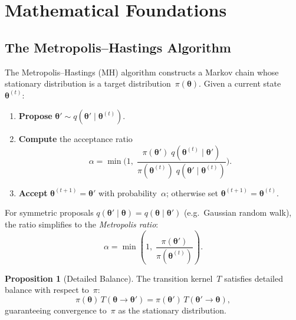 \documentclass[11pt,letterpaper,twocolumn]{article}
\theoremstyle{definition}
\newtheorem{proposition}{Proposition}
\begin{document}
\section{Mathematical Foundations}\label{sec:math}

\subsection{The Metropolis--Hastings Algorithm}

The Metropolis--Hastings (MH) algorithm constructs a Markov chain whose stationary distribution is a target distribution~$\pi(\bm{\theta})$.  Given a current state~$\bm{\theta}^{(t)}$:

\begin{enumerate}
  \item \textbf{Propose} $\bm{\theta}' \sim q(\bm{\theta}' \mid \bm{\theta}^{(t)})$.
  \item \textbf{Compute} the acceptance ratio
  \begin{equation}\label{eq:mh-ratio}
    \alpha = \min\!\Bigg(1,\;
      \frac{\pi(\bm{\theta}')\;q(\bm{\theta}^{(t)} \mid \bm{\theta}')}
           {\pi(\bm{\theta}^{(t)})\;q(\bm{\theta}' \mid \bm{\theta}^{(t)})}
    \Bigg).
  \end{equation}
  \item \textbf{Accept} $\bm{\theta}^{(t+1)} = \bm{\theta}'$ with probability~$\alpha$; otherwise set $\bm{\theta}^{(t+1)} = \bm{\theta}^{(t)}$.
\end{enumerate}

\noindent
For symmetric proposals $q(\bm{\theta}' \mid \bm{\theta}) = q(\bm{\theta} \mid \bm{\theta}')$ (e.g.\ Gaussian random walk), the ratio simplifies to the \emph{Metropolis ratio}:
\begin{equation}\label{eq:metropolis-ratio}
  \alpha = \min\!\left(1,\;\frac{\pi(\bm{\theta}')}{\pi(\bm{\theta}^{(t)})}\right).
\end{equation}

\begin{proposition}[Detailed Balance]
The transition kernel~$T$ satisfies detailed balance with respect to~$\pi$:
\begin{equation}
  \pi(\bm{\theta})\,T(\bm{\theta} \to \bm{\theta}')
  = \pi(\bm{\theta}')\,T(\bm{\theta}' \to \bm{\theta}),
\end{equation}
guaranteeing convergence to~$\pi$ as the stationary distribution.
\end{proposition}
\end{document}
